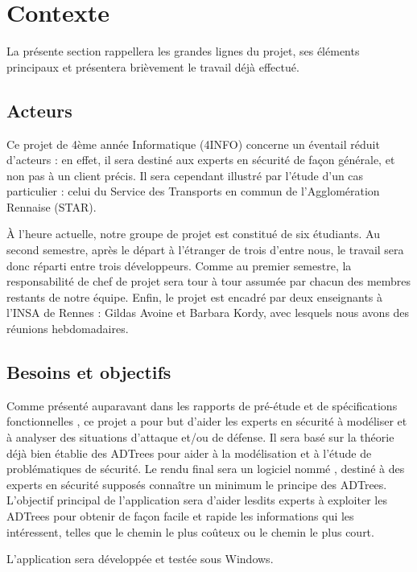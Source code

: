 \section{Contexte}
    \label{sec:contexte}
    La présente section rappellera les grandes lignes du projet, ses éléments principaux et présentera brièvement le travail déjà effectué.

    \subsection{Acteurs}
        Ce projet de 4ème année Informatique (4INFO) concerne un éventail réduit d'acteurs : en effet, il sera destiné aux experts en sécurité de façon générale, et non pas à un client précis. Il sera cependant illustré par l'étude d'un cas particulier : celui du Service des Transports en commun de l'Agglomération Rennaise (STAR).

        À l'heure actuelle, notre groupe de projet est constitué de six étudiants. Au second semestre, après le départ à l’étranger de trois d'entre nous, le travail sera donc réparti entre trois développeurs. Comme au premier semestre, la responsabilité de chef de projet sera tour à tour assumée par chacun des membres restants de notre équipe. Enfin, le projet est encadré par deux enseignants à l'INSA de Rennes : Gildas {\sc Avoine} et Barbara {\sc Kordy}, avec lesquels nous avons des réunions hebdomadaires.

    \subsection{Besoins et objectifs}
        Comme présenté auparavant dans les rapports de pré-étude %
        et de spécifications fonctionnelles %
        , ce projet a pour but d'aider les experts en sécurité à modéliser et à analyser des situations d'attaque et/ou de défense. Il sera basé sur la théorie déjà bien établie des ADTrees pour aider à la modélisation et à l'étude de problématiques de sécurité. Le rendu final sera un logiciel nommé \glasir{}, destiné à des experts en sécurité supposés connaître un minimum le principe des ADTrees. L'objectif principal de l'application sera d'aider lesdits experts à exploiter les ADTrees pour obtenir de façon facile et rapide les informations qui les intéressent, telles que le chemin le plus coûteux ou le chemin le plus court.

        L'application sera développée et testée sous Windows.

